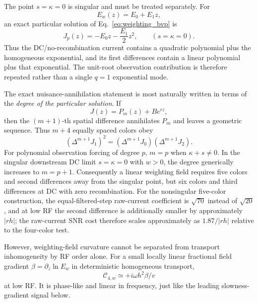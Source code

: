 \documentclass[11pt]{article}
\begin{document}
The point $s=\kappa=0$ is singular and must be treated separately. For
\begin{equation}
E_w(z)=E_0+E_1z,
\end{equation}
an exact particular solution of Eq.~\eqref{eq:weighting_bvp} is
\begin{equation}
\boxed{J_p(z)=-E_0z-\frac{E_1}{2}z^2,\qquad (s=\kappa=0).}
\label{eq:weighting_dc_particular}
\end{equation}
Thus the DC/no-recombination current contains a quadratic polynomial plus the homogeneous exponential, and its first differences contain a linear polynomial plus that exponential. The unit-root observation contribution is therefore repeated rather than a single $q=1$ exponential mode.

The exact nuisance-annihilation statement is most naturally written in terms of the \emph{degree of the particular solution}. If
\begin{equation}
J(z)=P_m(z)+Be^{rz},
\end{equation}
then the $(m+1)$-th spatial difference annihilates $P_m$ and leaves a geometric sequence. Thus $m+4$ equally spaced colors obey
\begin{equation}
\boxed{(\Delta^{m+1}J_1)^2=(\Delta^{m+1}J_0)(\Delta^{m+1}J_2).}
\label{eq:poly_annihilation}
\end{equation}
For polynomial observation forcing of degree $p$, $m=p$ when $\kappa+s\neq0$. In the singular downstream DC limit $s=\kappa=0$ with $w>0$, the degree generically increases to $m=p+1$. Consequently a linear weighting field requires five colors and second differences away from the singular point, but six colors and third differences at DC with zero recombination. For the nonsingular five-color construction, the equal-filtered-step raw-current coefficient is $\sqrt{70}$ instead of $\sqrt{20}$, and at low RF the second difference is additionally smaller by approximately $|rh|$; the raw-current SNR cost therefore scales approximately as $1.87/|rh|$ relative to the four-color test.

However, weighting-field curvature cannot be separated from transport inhomogeneity by RF order alone. For a small locally linear fractional field gradient $\beta=\partial_z\ln E_w$ in deterministic homogeneous transport,
\begin{equation}
\boxed{\mathcal C_{4,w}\simeq+i\omega h^2\beta/v}
\label{eq:weighting_lowrf}
\end{equation}
at low RF. It is phase-like and linear in frequency, just like the leading slowness-gradient signal below.
\end{document}
